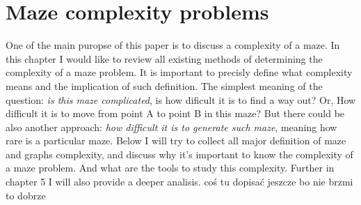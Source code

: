 \chapter{Maze complexity problems}\label{cha:background}
One of the main puropse of this paper is to discuss a complexity of a maze. In this chapter I would like to review all existing methods of determining the complexity of a maze problem.
It is important to precisly define what complexity means and the implication of such definition. The simplest meaning of the question: \textit{is this maze complicated}, is how dificult it is to find a way out? Or, How difficult it is to move from point A to point B in this maze?
But there could be also another approach: \textit{how difficult it is to generate such maze}, meaning how rare is a particular maze. Below I will try to collect all major definition of maze and graphs complexity, and discuss why it's important to know the complexity of a maze problem. 
And what are the tools to study this complexity. Further in chapter 5 I will also provide a deeper analisis. {coś tu dopisać jeszcze bo nie brzmi to dobrze }
